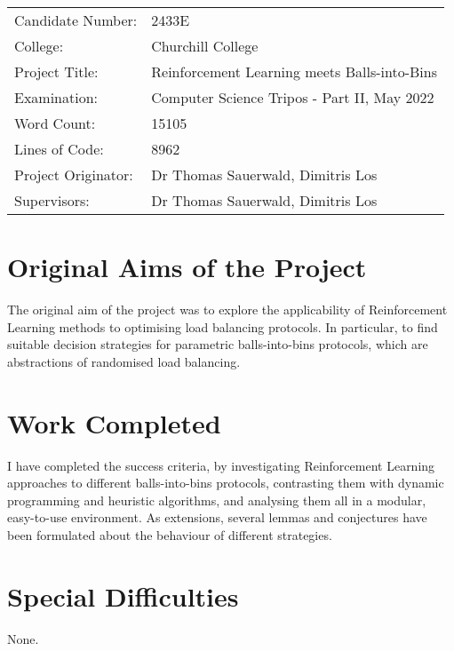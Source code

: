 
\begin{proforma}      


\begin{table}[h]
\begin{tabular}{ll}
Candidate Number:  & 2433E \\
College: & Churchill College \\
Project Title:    &  Reinforcement Learning meets Balls-into-Bins  \\
Examination:  & Computer Science Tripos - Part II, May 2022   \\
Word Count:  & 15105  \protect\footnotemark[1]\\
Lines of Code: & 8962 \protect\footnotemark[2] \\
Project Originator: & Dr Thomas Sauerwald, Dimitris Los \\
Supervisors: & Dr Thomas Sauerwald, Dimitris Los 
\end{tabular}
\end{table}




\section*{Original Aims of the Project}

The original aim of the project was to explore the applicability of Reinforcement Learning methods to optimising load balancing protocols. In particular, to find suitable decision strategies for parametric balls-into-bins protocols, which are abstractions of randomised load balancing.

\section*{Work Completed}

I have completed the success criteria, by investigating Reinforcement Learning approaches to different balls-into-bins protocols, contrasting them with dynamic programming and heuristic algorithms, and analysing them all in a modular, easy-to-use environment. As extensions, several lemmas and conjectures have been formulated about the behaviour of different strategies.

\section*{Special Difficulties}

None.

\end{proforma}
